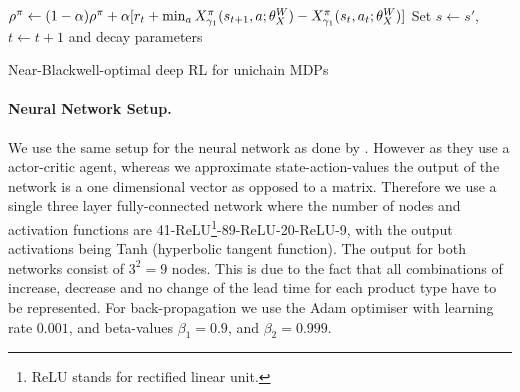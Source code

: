 \documentclass[envcountsame]{llncs}
\begin{document}
\begin{algorithm}[t!]
\begin{algorithmic}[1]
    \EndIf
    \\
    \hspace{2.4cm}\(\rho^{\pi} \gets (1- \alpha) \rho^{\pi} + \alpha [r_{t} +
      \min_{a}X^\pi_{\gamma_1}(s_{t+1},a; \theta_X^{W}{}) - X^\pi_{\gamma_1}(s_{t},a_{t};
      \theta_X^{W}{})]\)
    \EndIf
    \EndFor{}
    \EndFor{}
    \EndIf{}
    \State{} Set \(s \gets s'\), \(t \gets t+1\) and decay parameters
    \EndWhile{}
  \end{algorithmic}
  \caption{\label{alg:fin}Near-Blackwell-optimal deep RL for unichain MDPs}
\end{algorithm}


\paragraph*{Neural Network Setup.}
%
We use the same setup for the neural network as done by \cite{Schneckenreither2019}. However as they
use a actor-critic agent, whereas we approximate state-action-values the output of the network is a
one dimensional vector as opposed to a matrix. Therefore we use a single three layer fully-connected
network where the number of nodes and activation functions are 41-ReLU\footnote{ReLU stands for
  rectified linear unit.}-89-ReLU-20-ReLU-9, with the output activations being Tanh (hyperbolic
tangent function).
The output for both networks consist of $3^{2}=9$ nodes. This is due to the fact that all
combinations of increase, decrease and no change of the lead time for each product type have to be
represented.
For back-propagation we use the Adam optimiser with learning rate \(0.001\), and beta-values
\(\beta_{1}=0.9\), and \(\beta_{2}=0.999\).
\end{document}
